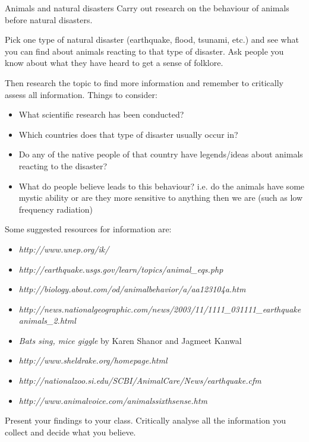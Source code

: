       \label{m38779*id1553831}
            \begin{activity}{Animals and natural disasters}
            \nopagebreak
        \label{m38779*id1164119615164}Carry out research on the behaviour of animals before natural disasters. \par 
        \label{m38779*id1164121934705}Pick one type of natural disaster (earthquake, flood, tsunami, etc.) and see what you can find about animals reacting to that type of disaster. Ask people you know about what they have heard to get a sense of folklore.\par 
        \label{m38779*id1164121037612}Then research the topic to find more information and remember to critically assess all information. Things to consider:\par 
        \label{m38779*id1164128014077}\begin{itemize}[noitemsep]
            \item What scientific research has been conducted?  
\item Which countries does that type of disaster usually occur in?
\item Do any of the native people of that country have legends/ideas about animals reacting to the disaster? 
\item What do people believe leads to this behaviour? i.e.\@{} do the animals have some mystic ability or are they more sensitive to anything then we are (such as low frequency radiation)\end{itemize}
Some suggested resources for information are: 
\begin{itemize}[noitemsep]
\item \textsl{http://www.unep.org/ik/}
\item \textsl{http://earthquake.usgs.gov/learn/topics/animal\_eqs.php}
\item \textsl{http://biology.about.com/od/animalbehavior/a/aa123104a.htm} 
\item \textsl{http://news.nationalgeographic.com/news/2003/11/1111\_031111\_earthquakeanimals\_2.html}
\item \textsl{Bats sing, mice giggle} by Karen Shanor and Jagmeet Kanwal
\item \textsl{http://www.sheldrake.org/homepage.html}
\item \textsl{http://nationalzoo.si.edu/SCBI/AnimalCare/News/earthquake.cfm}
\item \textsl{http://www.animalvoice.com/animalssixthsense.htm}
\end{itemize}
        \label{m38779*id1164121076422}Present your findings to your class. Critically analyse all the information you collect and decide what you believe. \par 
      \label{m38779*cid9}
      \end{activity}

